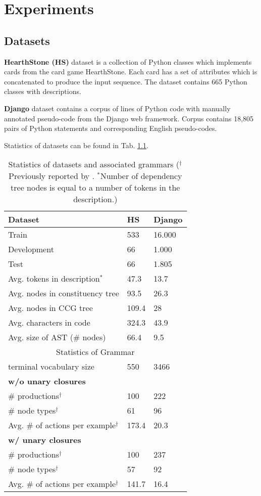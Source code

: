 \chapter{Experiments} \label{Chapter5} 

\section{Datasets}
\textbf{HearthStone (HS)}  dataset \parencite{Ling2016} is a collection of Python classes which implements cards from the card game HearthStone. Each card has a set of attributes which is concatenated to produce the input sequence. The dataset contains 665 Python classes with descriptions.

\textbf{Django} dataset \parencite{Oda2015} contains a corpus of lines of Python code with manually annotated pseudo-code from the Django web framework. Corpus contains 18,805 pairs of Python statements and corresponding English pseudo-codes. 

Statistics of datasets can be found in Tab. \ref{tab:stat}.

\begin{table}
\centering
\begin{tabular}{ l l l }
\hline
\textbf{Dataset} & \textbf{HS} & \textbf{Django} \\
\hline 
Train & 533 & 16.000 \\ 
Development & 66 & 1.000 \\ 
Test & 66 & 1.805 \\ 
\hline
Avg. tokens in description$^*$ & 47.3 & 13.7 \\
Avg. nodes in constituency tree & 93.5 & 26.3 \\
Avg. nodes in CCG tree & 109.4 & 28 \\
Avg. characters in code & 324.3 & 43.9 \\
Avg. size of AST (\# nodes) & 66.4 & 9.5 \\
 \hline
 \hline
\multicolumn{3}{c}{Statistics of Grammar} \\
terminal vocabulary size & 550 & 3466 \\ 
\hline
\multicolumn{3}{l}{\textbf{w/o unary closures}} \\
\# productions$^\dagger$ & 100 & 222 \\
\# node types$^\dagger$ & 61 & 96 \\
Avg. \# of actions per example$^\dagger$ & 173.4 & 20.3 \\ 
\hline
\multicolumn{3}{l}{\textbf{w/ unary closures}} \\
\# productions$^\dagger$ & 100 & 237 \\
\# node types$^\dagger$ & 57 & 92 \\
Avg. \# of actions per example$^\dagger$ & 141.7 & 16.4 \\ 
\hline
\end{tabular}
\caption[Statistics of datasets]{Statistics of datasets and associated grammars ($^\dagger$Previously reported by \cite{Yin2017}. $^*$Number of dependency tree nodes is equal to a number of tokens in the description.)}
\label{tab:stat}
\end{table}

